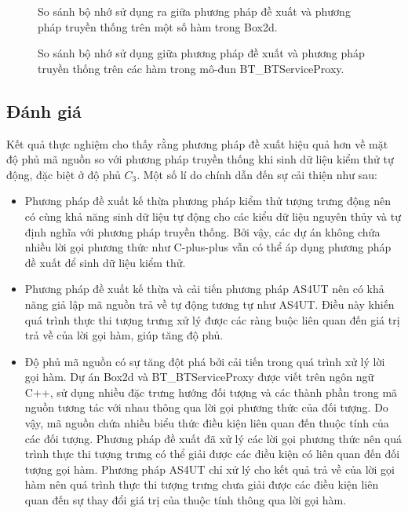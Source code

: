 \begin{figure}[H]
    \centering
    
    \caption{So sánh bộ nhớ sử dụng ra giữa phương pháp đề xuất và phương pháp truyền thống trên một số hàm trong Box2d.}
    \label{fig:mem-box2d}
\end{figure}

\begin{figure}[H]
    \centering
    
    \caption{So sánh bộ nhớ sử dụng giữa phương pháp đề xuất và phương pháp truyền thống trên các hàm trong mô-đun BT\_BTServiceProxy.}
    \label{fig:mem-serviceproxy}
\end{figure}

\subsection{Đánh giá}
Kết quả thực nghiệm cho thấy rằng phương pháp đề xuất hiệu quả hơn về mặt độ phủ mã nguồn so với phương pháp truyền thống khi sinh dữ liệu kiểm thử tự động, đặc biệt ở độ phủ $C_3$. Một số lí do chính dẫn đến sự cải thiện như sau:
\begin{itemize}
    \item Phương pháp đề xuất kế thừa phương pháp kiểm thử tượng trưng động nên có cùng khả năng sinh dữ liệu tự động cho các kiểu dữ liệu nguyên thủy và tự định nghĩa với phương pháp truyền thống. Bởi vậy, các dự án không chứa nhiều lời gọi phương thức như C-plus-plus vẫn có thể áp dụng phương pháp đề xuất để sinh dữ liệu kiểm thử.
  
    \item Phương pháp đề xuất kế thừa và cải tiến phương pháp AS4UT nên có khả năng giả lập mã nguồn trả về tự động tương tự như AS4UT. Điều này khiến quá trình thực thi tượng trưng xử lý được các ràng buộc liên quan đến giá trị trả về của lời gọi hàm, giúp tăng độ phủ.
    
    \item Độ phủ mã nguồn có sự tăng đột phá bởi cải tiến trong quá trình xử lý lời gọi hàm. Dự án Box2d và BT\_BTServiceProxy được viết trên ngôn ngữ C++, sử dụng nhiều đặc trưng hướng đối tượng và các thành phần trong mã nguồn tương tác với nhau thông qua lời gọi phương thức của đối tượng. Do vậy, mã nguồn chứa nhiều biểu thức điều kiện liên quan đến thuộc tính của các đối tượng. Phương pháp đề xuất đã xử lý các lời gọi phương thức nên quá trình thực thi tượng trưng có thể giải được các điều kiện có liên quan đến đối tượng gọi hàm. Phương pháp AS4UT chỉ xử lý cho kết quả trả về của lời gọi hàm nên quá trình thực thi tượng trưng chưa giải được các điều kiện liên quan đến sự thay đổi giá trị của thuộc tính thông qua lời gọi hàm.
\end{itemize}


